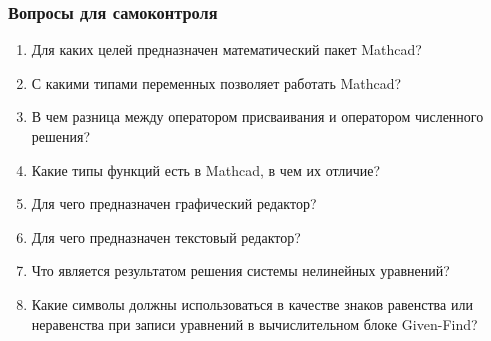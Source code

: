 \subsubsection*{Вопросы для самоконтроля}
\begin{enumerate}
	\item Для каких целей предназначен математический пакет Mathcad?
	\item С какими типами переменных позволяет работать Mathcad?
	\item В чем разница между оператором присваивания и оператором численного решения?
	\item Какие типы функций есть в Mathcad, в чем их отличие?
	\item Для чего предназначен графический редактор?
	\item Для чего предназначен текстовый редактор?
	\item Что является результатом решения системы нелинейных уравнений?
	\item Какие символы должны использоваться в качестве знаков равенства или неравенства при записи уравнений в вычислительном блоке Given-Find?
\end{enumerate}



